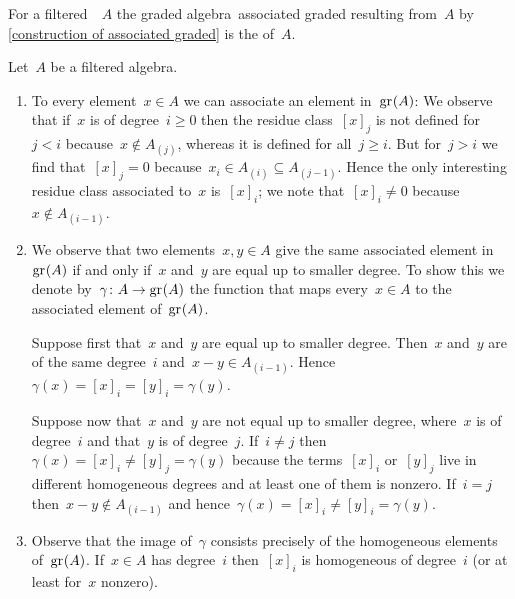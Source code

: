 \begin{definition}
  For a filtered~{\algebra{$\kf$}}~$A$ the graded algebra~\gls*{associated graded} resulting from~$A$ by \cref{construction of associated graded} is the  of~$A$.
\end{definition}


\begin{remark}
  Let~$A$ be a filtered algebra.
  \begin{enumerate}
    \item
      To every element~$x \in A$ we can associate an element in~$\gr(A)$:
      We observe that if~$x$ is of degree~$i \geq 0$ then the residue class~$[x]_j$ is not defined for~$j < i$ because~$x \notin A_{(j)}$, whereas it is defined for all~$j \geq i$.
      But for~$j > i$ we find that~$[x]_j = 0$ because~$x_i \in A_{(i)} \subseteq A_{(j-1)}$.
      Hence the only interesting residue class associated to~$x$ is~$[x]_i$;
      we note that~$[x]_i \neq 0$ because~$x \notin A_{(i-1)}$.
    \item
      We observe that two elements~$x, y \in A$ give the same associated element in~$\gr(A)$ if and only if~$x$ and~$y$ are equal up to smaller degree.
      To show this we denote by~$\gamma \colon A \to \gr(A)$ the function that maps every~$x \in A$ to the associated element of~$\gr(A)$.
      
      Suppose first that~$x$ and~$y$ are equal up to smaller degree.
      Then~$x$ and~$y$ are of the same degree~$i$ and~$x - y \in A_{(i-1)}$.
      Hence~$\gamma(x) = [x]_i = [y]_i = \gamma(y)$.
      
      Suppose now that~$x$ and~$y$ are not equal up to smaller degree, where~$x$ is of degree~$i$ and that~$y$ is of degree~$j$.
      If~$i \neq j$ then~$\gamma(x) = [x]_i \neq [y]_j = \gamma(y)$ because the terms~$[x]_i$ or~$[y]_j$ live in different homogeneous degrees and at least one of them is nonzero.
      If~$i = j$ then~$x - y \notin A_{(i-1)}$ and hence~$\gamma(x) = [x]_i \neq [y]_i = \gamma(y)$.
    \item
      Observe that the image of~$\gamma$ consists precisely of the homogeneous elements of~$\gr(A)$.
      If~$x \in A$ has degree~$i$ then~$[x]_i$ is homogeneous of degree~$i$ (or at least for~$x$ nonzero).
  \end{enumerate}
\end{remark}


